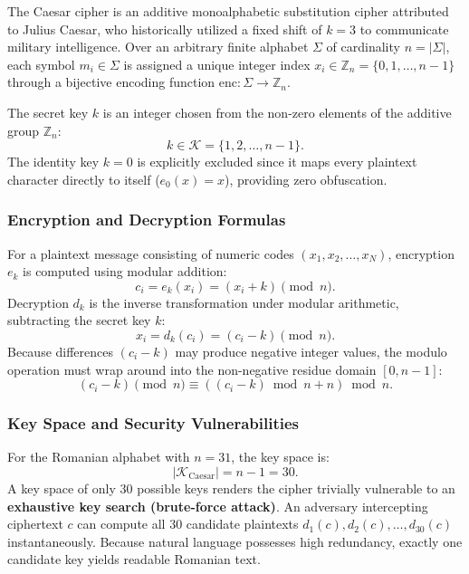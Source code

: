 \documentclass{labreport}
\begin{document}
The Caesar cipher is an additive monoalphabetic substitution cipher attributed to Julius Caesar, who historically utilized a fixed shift of $k = 3$ to communicate military intelligence. Over an arbitrary finite alphabet $\Sigma$ of cardinality $n = |\Sigma|$, each symbol $m_i \in \Sigma$ is assigned a unique integer index $x_i \in \mathbb{Z}_n = \{0, 1, \dots, n-1\}$ through a bijective encoding function $\text{enc}: \Sigma \to \mathbb{Z}_n$.

The secret key $k$ is an integer chosen from the non-zero elements of the additive group $\mathbb{Z}_n$:
\begin{equation}
    k \in \mathcal{K} = \{1, 2, \dots, n-1\}.
\end{equation}
The identity key $k = 0$ is explicitly excluded since it maps every plaintext character directly to itself ($e_0(x) = x$), providing zero obfuscation.

\subsubsection{Encryption and Decryption Formulas}
For a plaintext message consisting of numeric codes $(x_1, x_2, \dots, x_N)$, encryption $e_k$ is computed using modular addition:
\begin{equation}
    c_i = e_k(x_i) = (x_i + k) \pmod n.
\end{equation}
Decryption $d_k$ is the inverse transformation under modular arithmetic, subtracting the secret key $k$:
\begin{equation}
    x_i = d_k(c_i) = (c_i - k) \pmod n.
\end{equation}
Because differences $(c_i - k)$ may produce negative integer values, the modulo operation must wrap around into the non-negative residue domain $[0, n-1]$:
\begin{equation}
    (c_i - k) \pmod n \equiv ((c_i - k) \bmod n + n) \bmod n.
\end{equation}

\subsubsection{Key Space and Security Vulnerabilities}
For the Romanian alphabet with $n = 31$, the key space is:
\begin{equation}
    |\mathcal{K}_{\text{Caesar}}| = n - 1 = 30.
\end{equation}
A key space of only 30 possible keys renders the cipher trivially vulnerable to an \textbf{exhaustive key search (brute-force attack)}. An adversary intercepting ciphertext $c$ can compute all 30 candidate plaintexts $d_1(c), d_2(c), \dots, d_{30}(c)$ instantaneously. Because natural language possesses high redundancy, exactly one candidate key yields readable Romanian text.
\end{document}
